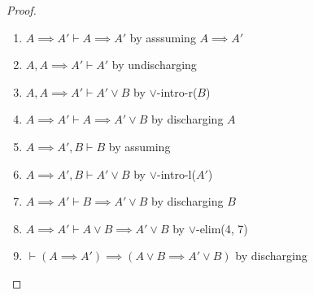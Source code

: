 \begin{proof}
\begin{enumerate}
\item $A\implies A'\vdash A\implies A'$ by asssuming $A\implies A'$%
\item $A,A\implies A'\vdash A'$ by undischarging%
\item $A,A\implies A'\vdash A'\lor B$ by $\lor$-intro-r($B$)%
\item $A\implies A'\vdash A\implies A'\lor B$ by discharging $A$%
\item $A\implies A', B\vdash B$ by assuming%
\item $A\implies A', B\vdash A'\lor B$ by $\lor$-intro-l($A'$)%
\item $A\implies A'\vdash B\implies A'\lor B$ by discharging $B$%
\item $A\implies A'\vdash A\lor B\implies A'\lor B$ by $\lor$-elim(4, 7)%
\item $\vdash(A\implies A')\implies(A\lor B\implies A'\lor B)$ by discharging
\qedhere
\end{enumerate}
\end{proof}

